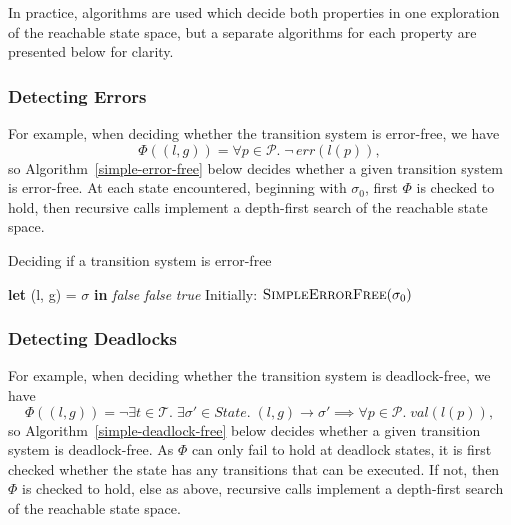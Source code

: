 \documentclass[12pt,a4paper,twoside,openright]{report}
\newcommand{\Let}[2]{\State \textbf{let} #1 = #2 \textbf{in}}
\begin{document}
In practice, algorithms are used which decide both
properties in one exploration of the reachable state space,
but a separate algorithms for each property are presented
below for clarity.

\subsubsection{Detecting Errors}
For example, when deciding whether the transition system
is error-free, we have
\[
	\Phi((l, g)) = \forall p \in \mathcal{P}.\; \neg\,err(l(p)),
\]
so Algorithm~\ref{simple-error-free} below decides whether a given transition system
is error-free. At each
state encountered, beginning with $\sigma_0$, first $\Phi$
is checked to hold, then recursive calls implement a
depth-first search of the reachable state space.

\begin{algorithm} \caption{Deciding if a transition system is error-free}
	\label{simple-error-free} \begin{algorithmic}[1]
	\Let{(l, g)}{$\sigma$}
		\Return \textit{false}
		\EndIf
	\EndFor {}
		\Return \textit{false}
		\EndIf
	\EndFor
	\State \Return \textit{true}
	\EndProcedure
	\State
	\State Initially: $\textsc{SimpleErrorFree}(\sigma_0)$
\end{algorithmic} \end{algorithm}

\subsubsection{Detecting Deadlocks}
For example, when deciding whether the transition system
is deadlock-free, we have
\[
	\Phi((l, g)) =\neg \exists t \in \mathcal{T}.\;
	\exists\sigma' \in \textit{State}.\;(l, g) \longrightarrow \sigma'
	\implies \forall p \in \mathcal{P}.\;\textit{val}(l(p)),
\]
so Algorithm~\ref{simple-deadlock-free} below decides whether a given transition system
is deadlock-free. As $\Phi$ can only fail to hold at deadlock states, it is first
checked whether the state has any transitions that can be executed. If not, then
$\Phi$ is checked to hold, else as above, recursive calls implement a
depth-first search of the reachable state space.
\end{document}
